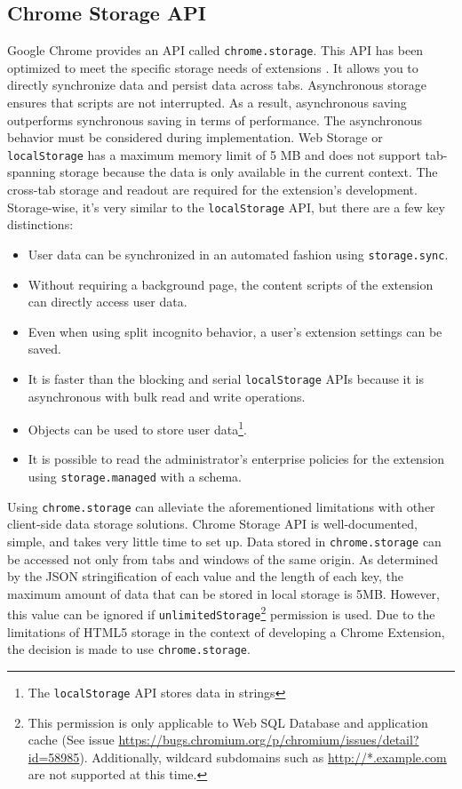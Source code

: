 \subsection*{Chrome Storage API}
Google Chrome provides an API called \texttt{chrome.storage}. This API has been optimized to meet the specific storage needs of extensions \autocite{chrome2021storage}. It allows you to directly synchronize data and persist data across tabs. Asynchronous storage ensures that scripts are not interrupted. As a result, asynchronous saving outperforms synchronous saving in terms of performance. The asynchronous behavior must be considered during implementation. Web Storage or \texttt{localStorage} has a maximum memory limit of 5 MB and does not support tab-spanning storage because the data is only available in the current context. The cross-tab storage and readout are required for the extension's development. Storage-wise, it's very similar to the \texttt{localStorage} API, but there are a few key distinctions:

\begin{itemize}
  \item User data can be synchronized in an automated fashion using \texttt{storage.sync}.
  \item Without requiring a background page, the content scripts of the extension can directly access user data.
  \item Even when using split incognito behavior, a user's extension settings can be saved.
  \item It is faster than the blocking and serial \texttt{localStorage} APIs because it is asynchronous with bulk read and write operations.
  \item Objects can be used to store user data\footnote{The \texttt{localStorage} API stores data in strings}.
  \item It is possible to read the administrator's enterprise policies for the extension using \texttt{storage.managed} with a schema.
\end{itemize}

Using \texttt{chrome.storage} can alleviate the aforementioned limitations with other client-side data storage solutions. Chrome Storage API is well-documented, simple, and takes very little time to set up. Data stored in \texttt{chrome.storage} can be accessed not only from tabs and windows of the same origin. As determined by the JSON stringification of each value and the length of each key, the maximum amount of data that can be stored in local storage is 5MB. However, this value can be ignored if \texttt{unlimitedStorage}\footnote{This permission is only applicable to Web SQL Database and application cache (See issue \url{https://bugs.chromium.org/p/chromium/issues/detail?id=58985}). Additionally, wildcard subdomains such as \url{http://*.example.com} are not supported at this time.} permission is used. Due to the limitations of HTML5 storage in the context of developing a Chrome Extension, the decision is made to use \texttt{chrome.storage}.
